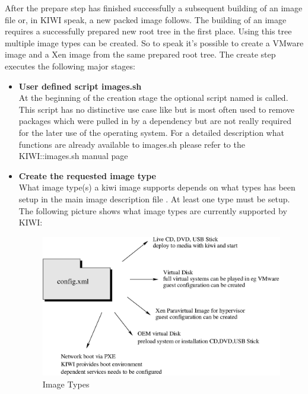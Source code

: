 After the prepare step has finished successfully a subsequent building of
an image file or, in KIWI speak, a new packed image follows.
The building of an image requires a successfully prepared new root
tree in the first place. Using this tree multiple image types can be
created. So to speak it's possible to create a VMware image and a
Xen image from the same prepared root tree. The create step executes the
following major stages:

\begin{itemize}
\item \textbf{User defined script images.sh}\\
      At the beginning of the creation stage the optional script named
       is called. This script has no distinctive use case like
       but is most often used to remove packages which were pulled
      in by a dependency but are not really required for the later use
      of the operating system. For a detailed description what
      functions are already available to images.sh please refer to
      the KIWI::images.sh manual page
\item \textbf{Create the requested image type}\\
      What image type(s) a kiwi image supports depends on what types has been
      setup in the main image description file . At least one type
      must be setup. The following picture shows what image types are
      currently supported by KIWI:

      \begin{figure}[h]
      \centering
      \includegraphics[scale=0.5]{pictures/types.eps}
      \caption{Image Types}
      \label{fig:types}
      \end{figure}
\end{itemize}

